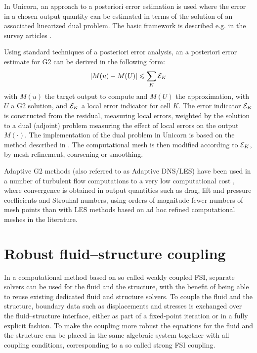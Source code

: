 In Unicorn, an approach to a posteriori error estimation is used where the error in a chosen output quantity can be estimated in terms of the solution of an associated linearized dual problem. The basic framework is described e.g. in the survey articles \citep{ErikssonEstepEtAl1995,BeckerRannacher2001,GilesSuli2002}.

Using standard techniques of a posteriori error analysis, an a posteriori error estimate for G2 can be derived in the following form:
\begin{equation}
\vert M(u) - M(U) \vert \leqslant \sum_K {\cal E}_K
\end{equation}
with $M(u)$ the target output to compute and $M(U)$ the approximation, with $U$ a G2 solution, and ${\cal E}_K$ a local error indicator for cell $K$.
The error indicator ${\cal E}_K$ is constructed from the residual, measuring local errors,
weighted by the solution to a dual (adjoint) problem measuring the effect of local errors
on the output $M(\cdot)$. The implementation of the dual problem in Unicorn is based on the \cgone{}\cgone{} method described in \citet{HoffmanJohnson2007}. The computational mesh is then modified according to $ {\cal E}_K$, by mesh refinement, coarsening or smoothing.

Adaptive G2 methods (also referred to as Adaptive DNS/LES) have been
used in a number of turbulent flow computations to a very low
computational
cost \citep{Hoffman2005,HoffmanJohnson2006b,Hoffman2006,Hoffman2009,HoffmanJansson2009,VilelaJanssonEtAl2010},
where convergence is obtained in output quantities such as drag, lift
and pressure coefficients and Strouhal numbers, using orders of
magnitude fewer numbers of mesh points than with LES methods based on
ad hoc refined computational meshes in the literature.

\section{Robust fluid--structure coupling}

In a computational method based on so called weakly coupled FSI,
separate solvers can be used for the fluid and the structure, with the
benefit of being able to reuse existing dedicated fluid and structure
solvers. To couple the fluid and the structure, boundary data such as
displacements and stresses is exchanged over the fluid--structure
interface, either as part of a fixed-point iteration or in a fully
explicit fashion. To make the coupling more robust the equations for
the fluid and the structure can be placed in the same algebraic system
together with all coupling conditions, corresponding to a so called
strong FSI coupling.

